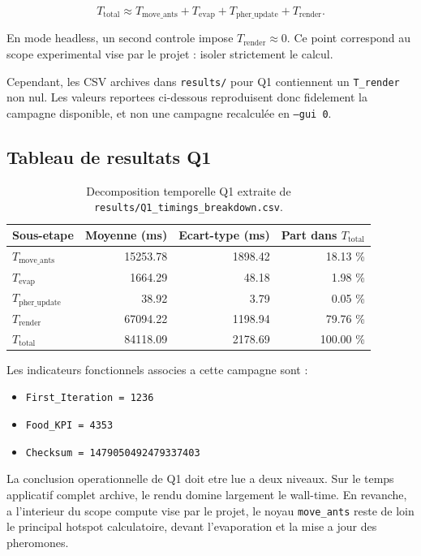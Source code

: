 \documentclass[11pt,a4paper]{article}
\begin{document}
\[
T_{\text{total}} \approx T_{\text{move\_ants}} + T_{\text{evap}} + T_{\text{pher\_update}} + T_{\text{render}}.
\]

En mode headless, un second controle impose \(T_{\text{render}} \approx 0\). Ce point correspond au scope experimental vise par le projet : isoler strictement le calcul.

Cependant, les CSV archives dans \texttt{results/} pour Q1 contiennent un \texttt{T\_render} non nul. Les valeurs reportees ci-dessous reproduisent donc fidelement la campagne disponible, et non une campagne recalculée en \texttt{--gui 0}.

\subsection{Tableau de resultats Q1}

\begin{table}[H]
  \centering
  \small
  \caption{Decomposition temporelle Q1 extraite de \texttt{results/Q1\_timings\_breakdown.csv}.}
  \label{tab:q1-breakdown}
  \begin{tabular}{@{}lrrr@{}}
    \toprule
    Sous-etape & Moyenne (ms) & Ecart-type (ms) & Part dans \(T_{\text{total}}\) \\
    \midrule
    \(T_{\text{move\_ants}}\) & 15253.78 & 1898.42 & 18.13 \% \\
    \(T_{\text{evap}}\) & 1664.29 & 48.18 & 1.98 \% \\
    \(T_{\text{pher\_update}}\) & 38.92 & 3.79 & 0.05 \% \\
    \(T_{\text{render}}\) & 67094.22 & 1198.94 & 79.76 \% \\
    \(T_{\text{total}}\) & 84118.09 & 2178.69 & 100.00 \% \\
    \bottomrule
  \end{tabular}
\end{table}

Les indicateurs fonctionnels associes a cette campagne sont :

\begin{itemize}[leftmargin=1.2em]
  \item \texttt{First\_Iteration = 1236}
  \item \texttt{Food\_KPI = 4353}
  \item \texttt{Checksum = 1479050492479337403}
\end{itemize}

La conclusion operationnelle de Q1 doit etre lue a deux niveaux. Sur le temps applicatif complet archive, le rendu domine largement le wall-time. En revanche, a l'interieur du scope compute vise par le projet, le noyau \texttt{move\_ants} reste de loin le principal hotspot calculatoire, devant l'evaporation et la mise a jour des pheromones.
\end{document}
